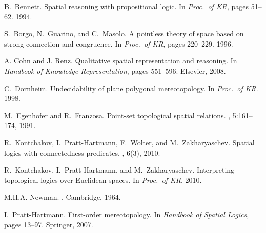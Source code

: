 \documentclass{article}
\begin{document}
\begin{thebibliography}{}\itemsep=1pt



B.~Bennett.
\newblock Spatial reasoning with propositional logic.
\newblock In {\em Proc.\ of KR}, pages 51--62.  1994.

S.~Borgo, N.~Guarino, and C.~Masolo.
\newblock A pointless theory of space based on strong connection and
  congruence.
\newblock In {\em Proc.\ of
  KR}, pages 220--229. 1996.

A. Cohn and J. Renz.
\newblock Qualitative spatial representation and reasoning.
\newblock In {\em
  Handbook of Kno\-w\-ledge Representation}, pages 551--596. Elsevier, 2008.

C.\ Dornheim.
\newblock Undecidability of plane po\-ly\-gonal mereo\-topology.
\newblock In {\em Proc.\ of KR}. 1998.


M.~Egenhofer and R.~Franzosa.
\newblock Point-set topological spatial relations.
,
  5:161--174, 1991.



R.~Kontchakov, I.~Pratt-Hartmann, F.~Wolter, and M.~Zakharyaschev.
\newblock Spatial logics with connectedness predicates.
, 6(3), 2010.

R.~Kontchakov, I.~Pratt-Hart\-mann, and M.~Zakharyaschev.
\newblock Interpreting topological logics over {E}uclidean spaces.
\newblock In {\em Proc.\
  of KR}. 2010.

M.H.A. Newman.
.
\newblock Cambridge, 1964.

I.~Pratt-Hartmann.
\newblock First-order mere\-o\-topology.
\newblock In {\em
  Handbook of Spatial Logics}, pages 13--97. Springer, 2007.


\end{thebibliography}
\end{document}
